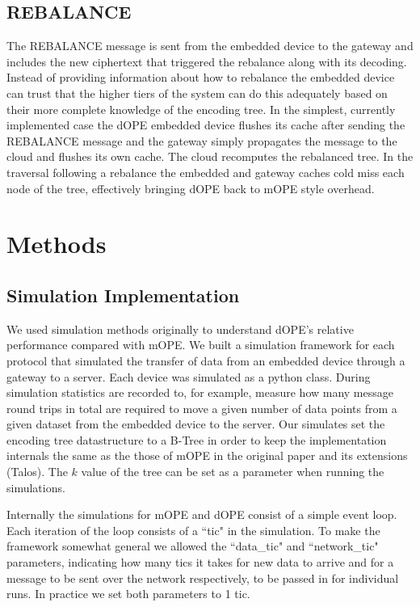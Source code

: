 \documentclass[12pt]{article}
\begin{document}
\subsection{REBALANCE}
The REBALANCE message is sent from the embedded device to the gateway and includes the new ciphertext that triggered the rebalance along with its decoding.  Instead of providing information about how to rebalance the embedded device can trust that the higher tiers of the system can do this adequately based on their more complete knowledge of the encoding tree.  In the simplest, currently implemented case the dOPE embedded device flushes its cache after sending the REBALANCE message and the gateway simply propagates the message to the cloud and flushes its own cache.  The cloud recomputes the rebalanced tree.  In the traversal following a rebalance the embedded and gateway caches cold miss each node of the tree, effectively bringing dOPE back to mOPE style overhead.

\section{Methods}

\subsection{Simulation Implementation}
We used simulation methods originally to understand dOPE's relative performance compared with mOPE.  We built a simulation framework for each protocol that simulated the transfer of data from an embedded device through a gateway to a server.  Each device was simulated as a python class.  During simulation statistics are recorded to, for example, measure how many message round trips in total are required to move a given number of data points from a given dataset from the embedded device to the server.  Our simulates set the encoding tree datastructure to a B-Tree in order to keep the implementation internals the same as the those of mOPE in the original paper and its extensions (Talos).  The $k$ value of the tree can be set as a parameter when running the simulations.  

Internally the simulations for mOPE and dOPE consist of a simple event loop.  Each iteration of the loop consists of a ``tic" in the simulation.  To make the framework somewhat general we allowed the ``data\_tic" and ``network\_tic" parameters,  indicating how many tics it takes for new data to arrive and for a message to be sent over the network respectively, to be passed in for individual runs.  In practice we set both parameters to 1 tic.
\end{document}
